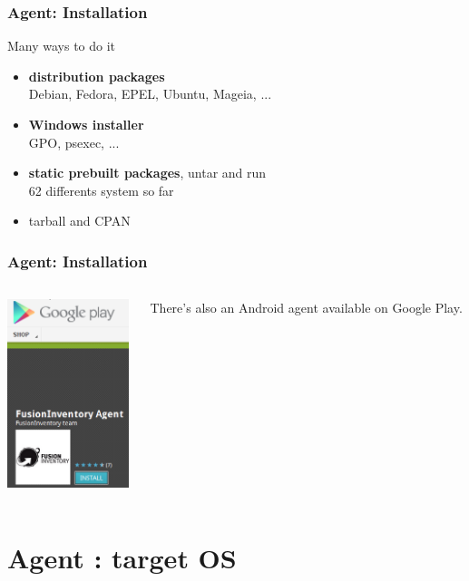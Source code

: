 \documentclass{beamer}
\begin{document}
\begin{frame}
    \frametitle{Agent: Installation}


    \begin{block}{Many ways to do it}
        \begin{itemize}
            \item \textbf{distribution packages} \\
            \small{Debian, Fedora, EPEL, Ubuntu, Mageia, ...}
            \item \textbf{Windows installer} \\
            \small{GPO, psexec, ...}
            \item \textbf{static prebuilt packages}, untar and run \\
            \small{62 differents system so far}
            \item tarball and CPAN
        \end{itemize}
    \end{block}
\end{frame}

\begin{frame}
    \frametitle{Agent: Installation}

   \begin{columns}
   \begin{column}{0.35\textwidth}
\includegraphics[height=5.5cm]{pics/googleplay.png}
 \end{column}
 \begin{column}{0.65\textwidth}
There's also an Android agent available on Google Play.
 \end{column}
\end{columns}

\end{frame}


\section{Agent : target OS}
\end{document}
